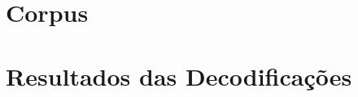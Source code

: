 \documentclass[12pt,twoside,a4paper]{book}
\renewcommand{\chaptermark}[1]{\markboth{\MakeUppercase{#1}}{}}
\begin{document}
\chapter{Corpus}
\label{ap:corpus}


\chapter{Resultados das Decodificações}
\label{ap:results}


\renewcommand{\chaptermark}[1]{\markboth{\MakeUppercase{\appendixname\ \thechapter}} {\MakeUppercase{#1}} }
\fancyhead[RE,LO]{}
\appendix

\backmatter \singlespacing   %



\end{document}
